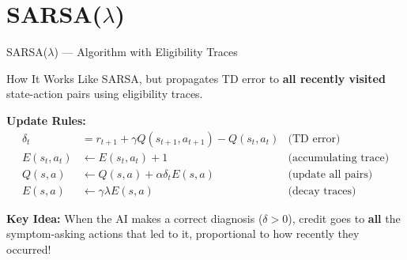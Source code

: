\documentclass[aspectratio=169]{beamer}
\begin{document}
\section{SARSA($\lambda$)}

\begin{frame}{SARSA($\lambda$) — Algorithm with Eligibility Traces}
    \begin{block}{How It Works}
        Like SARSA, but propagates TD error to \textbf{all recently visited} state-action pairs using eligibility traces.
    \end{block}

    \vspace{0.2cm}

    \textbf{Update Rules:}
    \begin{align*}
        \delta_t &= r_{t+1} + \gamma Q(s_{t+1}, a_{t+1}) - Q(s_t, a_t) & \text{(TD error)} \\
        E(s_t, a_t) &\leftarrow E(s_t, a_t) + 1 & \text{(accumulating trace)} \\
        Q(s,a) &\leftarrow Q(s,a) + \alpha \delta_t E(s,a) & \text{(update all pairs)} \\
        E(s,a) &\leftarrow \gamma \lambda E(s,a) & \text{(decay traces)}
    \end{align*}

    \vspace{0.2cm}

    \textbf{Key Idea:} When the AI makes a correct diagnosis ($\delta > 0$), credit goes to \textbf{all} the symptom-asking actions that led to it, proportional to how recently they occurred!
\end{frame}
\end{document}
